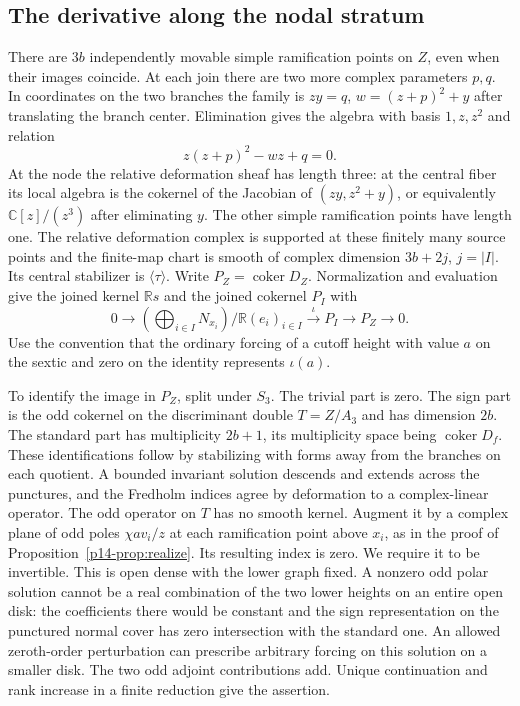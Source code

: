 \subsection{The derivative along the nodal stratum}
There are $3b$ independently movable simple ramification points on
$Z$, even when their images coincide. At each join there are two more
complex parameters $p,q$. In coordinates on the two branches the
family is $z y=q$, $w=(z+p)^2+y$ after translating the branch center.
Elimination gives the algebra with basis $1,z,z^2$ and relation
\begin{equation}\label{p14-eq:cubicpolynomial}
                   z(z+p)^2-wz+q=0 .
\end{equation}
At the node the relative deformation sheaf has length three: at the
central fiber its local algebra is the cokernel of the Jacobian of
$(zy,z^2+y)$, or equivalently $\mathbb C[z]/(z^3)$ after eliminating
$y$. The other simple ramification points have length one. The
relative deformation complex is supported at these finitely many
source points and the finite-map chart is smooth of complex dimension
$3b+2j$, $j=|I|$. Its central stabilizer is $\langle\tau\rangle$.
Write $P_Z=\operatorname{coker}D_Z$. Normalization and evaluation
give the joined kernel $\mathbb Rs$ and the joined cokernel $P_I$ with
\begin{equation}\label{p14-eq:joinedsequence}
 0\longrightarrow
 (\bigoplus_{i\in I}N_{x_i})/\mathbb R(e_i)_{i\in I}
 \xrightarrow{\iota}P_I\longrightarrow P_Z\longrightarrow0 .
\end{equation}
Use the convention that the ordinary forcing of a cutoff height
with value $a$ on the sextic and zero on the identity represents
$\iota(a)$.

To identify the image in $P_Z$, split under $S_3$. The trivial
part is zero. The sign part is the odd cokernel on the discriminant
double $T=Z/A_3$ and has dimension $2b$. The standard part has
multiplicity $2b+1$, its multiplicity space being
$\operatorname{coker}D_f$. These identifications follow by stabilizing
with forms away from the branches on each quotient. A bounded
invariant solution descends and extends across the punctures, and
the Fredholm indices agree by deformation to a complex-linear
operator. The odd operator on $T$ has no smooth kernel. Augment it
by a complex plane of odd poles $\chi a v_i/z$ at each ramification
point above $x_i$, as in the proof of Proposition~\ref{p14-prop:realize}.
Its resulting index is zero. We require it to be invertible. This
is open dense with the lower graph fixed. A nonzero odd polar
solution cannot be a real combination of the two lower heights on
an entire open disk: the coefficients there would be constant and
the sign representation on the punctured normal cover has zero
intersection with the standard one. An allowed zeroth-order
perturbation can prescribe arbitrary forcing on this solution on
a smaller disk. The two odd adjoint contributions add. Unique
continuation and rank increase in a finite reduction give the
assertion.

